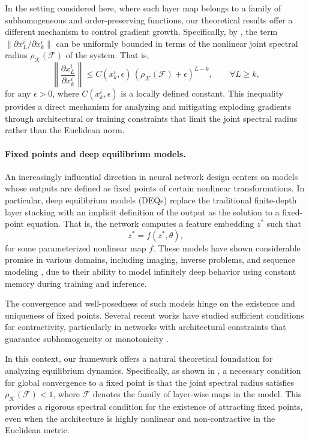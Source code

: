 \documentclass{article}
\newcommand{\family}{\mathcal{F}}
\newcommand{\cradius}{\rho_{\cone}}
\newcommand{\cone}{\mathcal{K}}
\begin{document}
In the setting considered here, where each layer map belongs to a family of subhomogeneous and order-preserving functions, our theoretical results offer a different mechanism to control gradient growth. Specifically, by , the term $\| \partial x_L^i / \partial x_k^i \|$ can be uniformly bounded in terms of the nonlinear joint spectral radius $\cradius(\family)$ of the system. That is,
\begin{equation}
    \left\|\frac{\partial x_L^i}{\partial x_k^i} \right\| \leq C(x_k^i, \epsilon)\, (\cradius(\family) + \epsilon)^{L - k}, \qquad \forall L \geq k,
\end{equation}
for any $\epsilon > 0$, where $C(x_k^i, \epsilon)$ is a locally defined constant.
This inequality provides a direct mechanism for analyzing and mitigating exploding gradients through architectural or training constraints that limit the joint spectral radius rather than the Euclidean norm. 



\paragraph{Fixed points and deep equilibrium models.}
An increasingly influential direction in neural network design centers on models whose outputs are defined as fixed points of certain nonlinear transformations. In particular, deep equilibrium models (DEQs) \cite{bai2019deep} replace the traditional finite-depth layer stacking with an implicit definition of the output as the solution to a fixed-point equation. That is, the network computes a feature embedding $z^*$ such that
\begin{equation}
    z^* = f(z^*, \theta),
\end{equation}
for some parameterized nonlinear map $f$. These models have shown considerable promise in various domains, including imaging, inverse problems, and sequence modeling \cite{bai2019deep, gilton2021deep}, due to their ability to model infinitely deep behavior using constant memory during training and inference.

The convergence and well-posedness of such models hinge on the existence and uniqueness of fixed points. Several recent works have studied sufficient conditions for contractivity, particularly in networks with architectural constraints that guarantee subhomogeneity or monotonicity \cite{sittonisubhomogeneous, piotrowski2024fixed}. 

In this context, our framework offers a natural theoretical foundation for analyzing equilibrium dynamics. Specifically, as shown in , a necessary condition for global convergence to a fixed point is that the joint spectral radius satisfies $\cradius(\family) < 1$, where $\family$ denotes the family of layer-wise maps in the model. This provides a rigorous spectral condition for the existence of attracting fixed points, even when the architecture is highly nonlinear and non-contractive in the Euclidean metric.
\end{document}
